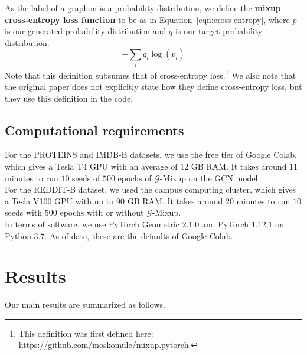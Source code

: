 As the label of a graphon is a probability distribution, we define the \textbf{mixup cross‐entropy loss function} to be as in Equation~\ref{eqn:cross entropy}, where $p$ is our generated probability distribution and $q$ is our target probability distribution.
\begin{equation}-\sum_i q_i \log(p_i)\label{eqn:cross entropy}\end{equation}
Note that this definition subsumes that of cross-entropy loss.\footnote{This definition was first defined here: \href{https://github.com/moskomule/mixup.pytorch}{https://github.com/moskomule/mixup.pytorch}.} We also note that the original paper does not explicitly state how they define cross-entropy loss, but they use this definition in the code.

\subsection{Computational requirements}

For the PROTEINS and IMDB-B datasets, we use the free tier of Google Colab, which gives a Tesla T4 GPU with an average of $12$ GB RAM. It takes around $11$ minutes to run $10$ seeds of $500$ epochs of $\mathcal{G}$-Mixup on the GCN model.
\\

For the REDDIT-B dataset, we used the campus computing cluster, which gives a Tesla V100 GPU with up to $90$ GB RAM. It takes around $20$ minutes to run $10$ seeds with $500$ epochs with or without $\mathcal{G}$-Mixup.
\\

In terms of software, we use PyTorch Geometric $2.1.0$ and PyTorch $1.12.1$ on Python $3.7$. As of date, these are the defaults of Google Colab.


\section{Results}
\label{sec:results}

Our main results are summarized as follows.

